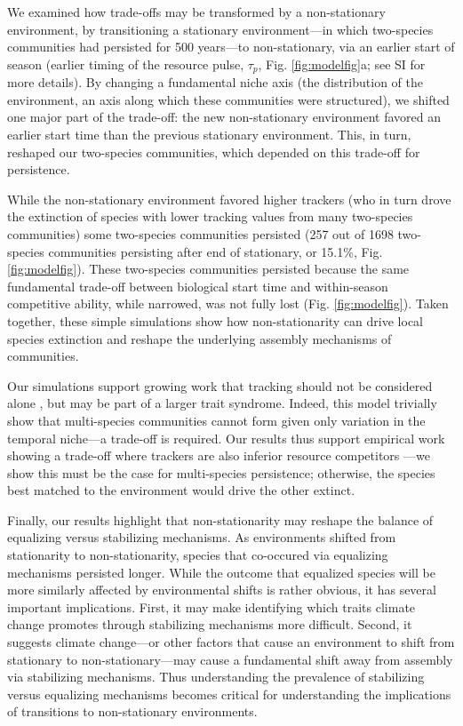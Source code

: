 \documentclass[11pt,letterpaper]{article}
\begin{document}
We examined how trade-offs may be transformed by a non-stationary environment, by transitioning a stationary environment---in which two-species communities had persisted for 500 years---to non-stationary, via an earlier start of season (earlier timing of the resource pulse, $\tau_p$, Fig. \ref{fig:modelfig}a; see SI for more details). By changing a fundamental niche axis (the distribution of the environment, an axis along which these communities were structured), we shifted one major part of the trade-off: the new non-stationary environment favored an earlier start time than the previous stationary environment. This, in turn, reshaped our two-species communities, which depended on this trade-off for persistence. 

While the non-stationary environment favored higher trackers (who in turn drove the extinction of species with lower tracking values from many two-species communities) some two-species communities persisted (257 out of 1698 two-species communities persisting after end of stationary, or 15.1\%, Fig. \ref{fig:modelfig}). These two-species communities persisted because the same fundamental trade-off between biological start time and within-season competitive ability, while narrowed, was not fully lost (Fig. \ref{fig:modelfig}). Taken together, these simple simulations show how non-stationarity can drive local species extinction and reshape the underlying assembly mechanisms of communities.

Our simulations support growing work that tracking should not be considered alone \citep{Diamond:2011nx,Dorji2013,Ishioka2013,kharouba2014,du2017}, but may be part of a larger trait syndrome. Indeed, this model trivially show that multi-species communities cannot form given only variation in the temporal niche---a trade-off is required. Our results thus support empirical work showing a trade-off where trackers are also inferior resource competitors \citep{lasky2016,Zhu2016BioLetters}---we show this must be the case for multi-species persistence; otherwise, the species best matched to the environment would drive the other extinct.

Finally, our results highlight that non-stationarity may reshape the balance of equalizing versus stabilizing mechanisms. As environments shifted from stationarity to non-stationarity, species that co-occured via equalizing mechanisms persisted longer. While the outcome that equalized species will be more similarly affected by environmental shifts is rather obvious, it has several important implications. First, it may make identifying which traits climate change promotes through stabilizing mechanisms more difficult. Second, it suggests climate change---or other factors that cause an environment to shift from stationary to non-stationary---may cause a fundamental shift away from assembly via stabilizing mechanisms. Thus understanding the prevalence of stabilizing versus equalizing mechanisms \citep[which ecology has worked on for many decades,][]{Caswell:1976np,Chesson:2000vd} becomes critical for understanding the implications of transitions to non-stationary environments. 
\end{document}

